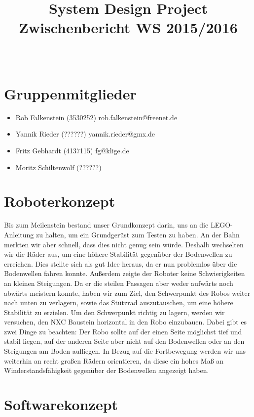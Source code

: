 \documentclass[11pt,a4paper]{article}
\title{
  \Huge System Design Project \\
  \LARGE Zwischenbericht WS 2015/2016
}
\author{
  \Large \todo{Der fühlende Psi Bot \#14}\\
}
\begin{document}
\maketitle

\section{Gruppenmitglieder}
\begin{itemize}
  \item {Rob Falkenstein (3530252) rob.falkenstein@freenet.de}
	\item	{Yannik Rieder (??????) yannik.rieder@gmx.de}
	\item	{Fritz Gebhardt (4137115) fg@klige.de}
	\item	{Moritz Schiltenwolf (??????)}
\end{itemize}

\section{Roboterkonzept}

Bis zum Meilenstein bestand unser Grundkonzept darin, uns an die LEGO-Anleitung zu halten, um ein Grundgerüst zum Testen zu haben. 
An der Bahn merkten wir aber schnell, dass dies nicht genug sein würde. Deshalb wechselten wir die Räder aus, um eine höhere Stabilität 
gegenüber der Bodenwellen zu erreichen. Dies stellte sich als gut Idee heraus, da er nun problemlos über die Bodenwellen fahren konnte.
Außerdem zeigte der Roboter keine Schwierigkeiten an kleinen Steigungen. Da er die steilen Passagen aber weder aufwärts noch abwärts
meistern konnte, haben wir zum Ziel, den Schwerpunkt des Robos weiter nach unten zu verlagern, sowie das Stützrad auszutauschen, um eine
höhere Stabilität zu erzielen. Um den Schwerpunkt richtig zu lagern, werden wir versuchen, den NXC Baustein horizontal in den Robo
einzubauen. Dabei gibt es zwei Dinge zu beachten: Der Robo sollte auf der einen Seite möglichst tief und stabil liegen, auf der anderen Seite
aber nicht auf den Bodenwellen oder an den Steigungen am Boden aufliegen. 
In Bezug auf die Fortbewegung werden wir uns weiterhin an recht großen Rädern orientieren, da diese ein hohes Maß an Winderstandsfähigkeit
gegenüber der Bodenwellen angezeigt haben.

\section{Softwarekonzept}
\end{document}
